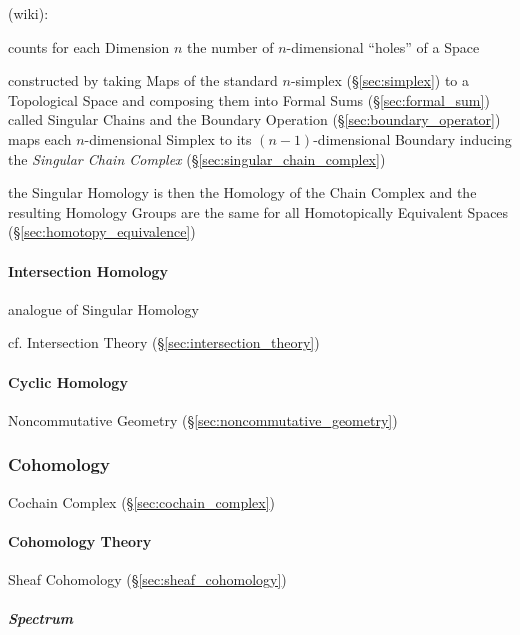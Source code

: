 (wiki):

counts for each Dimension $n$ the number of $n$-dimensional ``holes'' of a
Space

constructed by taking Maps of the standard $n$-simplex (\S\ref{sec:simplex}) to
a Topological Space and composing them into Formal Sums
(\S\ref{sec:formal_sum}) called Singular Chains and the Boundary Operation
(\S\ref{sec:boundary_operator}) maps each $n$-dimensional Simplex to its
$(n-1)$-dimensional Boundary inducing the \emph{Singular Chain Complex}
(\S\ref{sec:singular_chain_complex})

the Singular Homology is then the Homology of the Chain Complex and the
resulting Homology Groups are the same for all Homotopically Equivalent Spaces
(\S\ref{sec:homotopy_equivalence})



\paragraph{Intersection Homology}\label{sec:intersection_homology}\hfill

analogue of Singular Homology

\fist cf. Intersection Theory (\S\ref{sec:intersection_theory})



\paragraph{Cyclic Homology}\label{sec:cyclic_homology}\hfill

Noncommutative Geometry (\S\ref{sec:noncommutative_geometry})



\subsubsection{Cohomology}\label{sec:cohomology}

Cochain Complex (\S\ref{sec:cochain_complex})



\paragraph{Cohomology Theory}\label{sec:cohomology_theory}\hfill

Sheaf Cohomology (\S\ref{sec:sheaf_cohomology})



\subparagraph{Spectrum}\label{sec:cohomology_spectrum}\hfill


